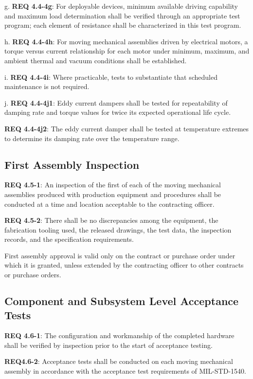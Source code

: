 \documentclass[12pt]{article}
\begin{document}
g. \noindent \textbf{REQ 4.4-4g}: For deployable devices, minimum available driving capability and maximum load determination shall be verified through an appropriate test program; each element of resistance shall be characterized in this test program.

h. \noindent \textbf{REQ 4.4-4h}: For moving mechanical assemblies driven by electrical motors, a torque versus current relationship for each motor under minimum, maximum, and ambient thermal and vacuum conditions shall be established.

i. \noindent \textbf{REQ 4.4-4i}: Where practicable, tests to substantiate that scheduled maintenance is not required.

j. \noindent \textbf{REQ 4.4-4j1}: Eddy current dampers shall be tested for repeatability of damping rate and torque values for twice its expected operational life cycle. 

\noindent \textbf{REQ 4.4-4j2}: The eddy current damper shall be tested at temperature extremes to determine its damping rate over the temperature range.


\subsection{First Assembly Inspection} %
\noindent \textbf{REQ 4.5-1}: An inspection of the first of each of the moving mechanical assemblies produced with production equipment and procedures shall be conducted at a time and location acceptable to the contracting officer. 

\noindent \textbf{REQ 4.5-2}: There shall be no discrepancies among the equipment, the fabrication tooling used, the released drawings, the test data, the inspection records, and the specification requirements. 

First assembly approval is valid only on the contract or purchase order under which it is granted, unless extended by the contracting officer to other contracts or purchase orders.


\subsection{Component and Subsystem Level Acceptance Tests} %
\noindent \textbf{REQ 4.6-1}: The configuration and workmanship of the completed hardware shall be verified by inspection prior to the start of acceptance testing.

\noindent \textbf{REQ4.6-2}: Acceptance tests shall be conducted on each moving mechanical assembly in accordance with the acceptance test requirements of MIL-STD-1540. 
\end{document}
